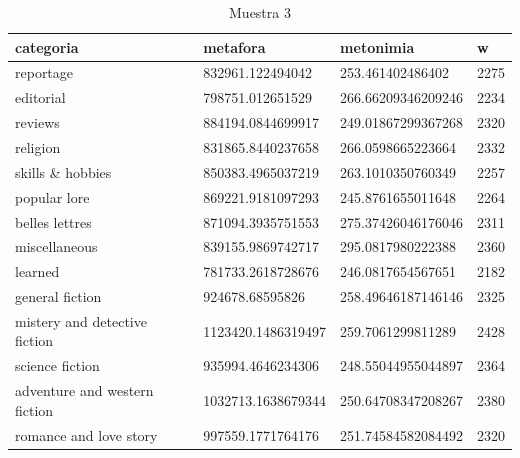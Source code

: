 \documentclass[twoside]{article}
\begin{document}
\begin{center}
        \begin{longtable}{| p{} | p{} | p{}|p{}|}
\caption{Muestra 3}
    \hline
          categoria & metafora & metonimia & w \\ \hline
        reportage & 832961.122494042 & 253.461402486402 & 2275 \\ \hline
        editorial & 798751.012651529 & 266.66209346209246 & 2234 \\ \hline
        reviews & 884194.0844699917 & 249.01867299367268 & 2320 \\ \hline
        religion & 831865.8440237658 & 266.0598665223664 & 2332 \\ \hline
        skills \& hobbies & 850383.4965037219 & 263.1010350760349 & 2257 \\ \hline
        popular lore & 869221.9181097293 & 245.8761655011648 & 2264 \\ \hline
        belles lettres & 871094.3935751553 & 275.37426046176046 & 2311 \\ \hline
        miscellaneous & 839155.9869742717 & 295.0817980222388 & 2360 \\ \hline
        learned & 781733.2618728676 & 246.0817654567651 & 2182 \\ \hline
        general fiction & 924678.68595826 & 258.49646187146146 & 2325 \\ \hline
        mistery and detective fiction & 1123420.1486319497 & 259.7061299811289 & 2428 \\ \hline
        science fiction & 935994.4646234306 & 248.55044955044897 & 2364 \\ \hline
        adventure and western fiction & 1032713.1638679344 & 250.64708347208267 & 2380 \\ \hline
        romance and love story & 997559.1771764176 & 251.74584582084492 & 2320 \\ \hline
\end{longtable}
    \label{muestra3}
\end{center}
\end{document}
